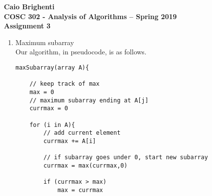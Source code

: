 \documentclass{article}
\begin{document}
\noindent \textbf{Caio Brighenti }\\
\noindent \textbf{COSC 302 - Analysis of Algorithms -- Spring 2019}\\%
\noindent \textbf{Assignment 3}\vspace{1em}\\
\begin{enumerate}
	\item Maximum subarray
	\\ Our algorithm, in pseudocode, is as follows.
	\begin{lstlisting}
maxSubarray(array A){
		
	// keep track of max		
	max = 0
	// maximum subarray ending at A[j]
	currmax = 0
		
	for (i in A){
		// add current element
		currmax += A[i]
		
		// if subarray goes under 0, start new subarray
		currmax = max(currmax,0)
		
		if (currmax > max)
			max = currmax
		

\end{lstlisting}
\end{enumerate}
\end{document}

